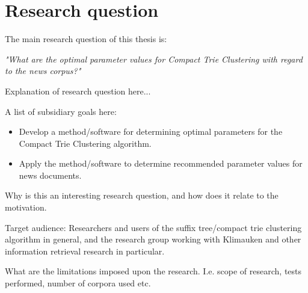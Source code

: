 
\section{Research question}
The main research question of this thesis is:

\emph{"What are the optimal parameter values for Compact Trie Clustering with regard to the news corpus?"}

Explanation of research question here...

A list of subsidiary goals here:

\begin{itemize}
	\item Develop a  method/software for determining optimal parameters for the Compact Trie Clustering algorithm.
	\item Apply the method/software to determine recommended parameter values for news documents.
\end{itemize}

Why is this an interesting research question, and how does it relate to the motivation.

Target audience:
Researchers and users of the suffix tree/compact trie clustering algorithm in general, and the research group working with Klimauken and other information retrieval research in particular.

What are the limitations imposed upon the research. I.e. scope of research, tests performed, number of corpora used etc.